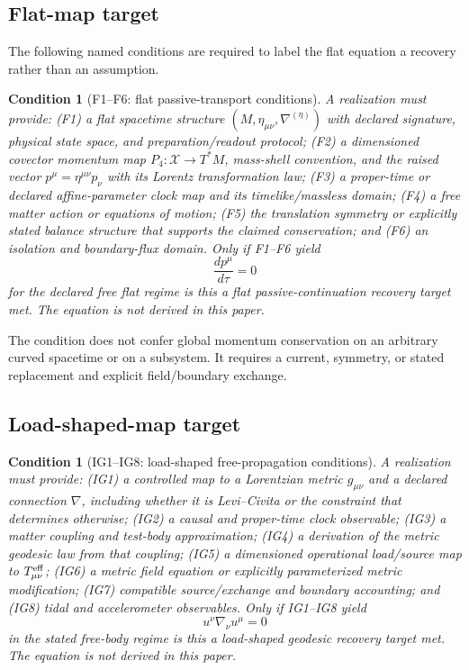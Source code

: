 \documentclass[11pt,a4paper]{article}
\newtheorem{condition}[definition]{Condition}
\theoremstyle{remark}
\newcommand{\State}{\mathcal X}
\begin{document}
\subsection{Flat-map target}
The following named conditions are required to label the flat equation a
recovery rather than an assumption.
\begin{condition}[F1--F6: flat passive-transport conditions]\label{cond:flat}
A realization must provide: (F1) a flat spacetime structure
$(M,\eta_{\mu\nu},\nabla^{(\eta)})$ with declared signature, physical state
space, and preparation/readout protocol; (F2) a dimensioned covector momentum
map $P_4:\State\to T^*M$, mass-shell convention, and the raised vector
$p^\mu=\eta^{\mu\nu}p_\nu$ with its Lorentz transformation law; (F3) a
proper-time or declared affine-parameter clock map and its timelike/massless
domain; (F4) a free matter action or equations of motion; (F5) the translation
symmetry or explicitly stated balance structure that supports the claimed
conservation; and (F6) an isolation and boundary-flux domain. Only if F1--F6
yield
\[
 \boxed{\frac{dp^\mu}{d\tau}=0}
\]
for the declared free flat regime is this a flat passive-continuation recovery
target met. The equation is not derived in this paper.
\end{condition}

The condition does not confer global momentum conservation on an arbitrary
curved spacetime or on a subsystem. It requires a current, symmetry, or stated
replacement and explicit field/boundary exchange.

\subsection{Load-shaped-map target}
\begin{condition}[IG1--IG8: load-shaped free-propagation conditions]\label{cond:curved}
A realization must provide: (IG1) a controlled map to a Lorentzian metric
$g_{\mu\nu}$ and a declared connection $\nabla$, including whether it is
Levi--Civita or the constraint that determines otherwise; (IG2) a causal and
proper-time clock observable; (IG3) a matter coupling and test-body
approximation; (IG4) a derivation of the metric geodesic law from that coupling;
(IG5) a dimensioned operational load/source map to $T^{\rm eff}_{\mu\nu}$;
(IG6) a metric field equation or explicitly parameterized metric modification;
(IG7) compatible source/exchange and boundary accounting; and (IG8) tidal and
accelerometer observables. Only if IG1--IG8 yield
\[
 \boxed{u^\nu\nabla_\nu u^\mu=0}
\]
in the stated free-body regime is this a load-shaped geodesic recovery target
met. The equation is not derived in this paper.
\end{condition}
\end{document}
